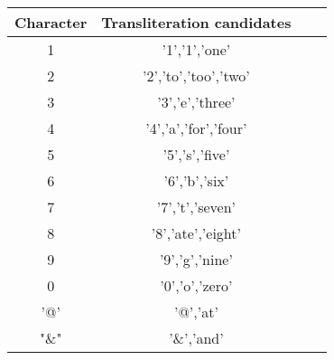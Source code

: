 
 \begin{tabular}{c c c c} 
 \hline
 Character & Transliteration candidates \\ [0.5ex] 
 \hline\hline
 1 & '1','1','one' \\ 

 2 & '2','to','too','two' \\

 3 & '3','e','three'\\

 4 & '4','a','for','four' \\
 
 5 & '5','s','five' \\ 

 6 & '6','b','six' \\

 7 & '7','t','seven'\\

 8 & '8','ate','eight' \\
 
 9 & '9','g','nine' \\ 

 0 & '0','o','zero' \\

 '@' & '@','at'\\

 "\&" & '\&','and' \\

 \hline
\end{tabular}